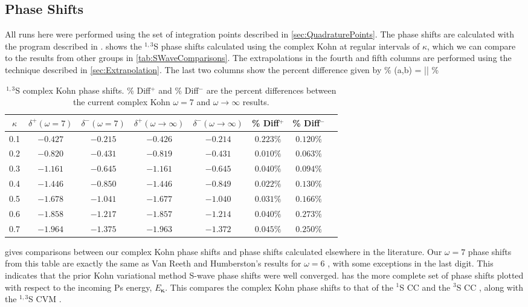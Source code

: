 \documentclass[Dissertation.tex]{subfiles}
\begin{document}
\subsection{Phase Shifts}
All runs here were performed using the set of integration points described in \cref{sec:QuadraturePoints}. The phase shifts are calculated with the program described in \cite{}.  shows the $^{1,3}$S phase shifts calculated using the complex Kohn at regular intervals of $\kappa$, which we can compare to the results from other groups in \cref{tab:SWaveComparisons}. The extrapolations in the fourth and fifth columns are performed using the technique described in \cref{sec:Extrapolation}. The last two columns show the percent difference given by
\beq
\% (a,b) = \left|\right| \%
\eeq

\begin{table}[H]
\centering
\begin{tabular}{c c c c c c c c}
\toprule
$\kappa$ & $\delta^+ (\omega = 7)$ & $\delta^- (\omega = 7)$ & $\delta^+ (\omega \rightarrow \infty)$ & $\delta^- (\omega \rightarrow \infty)$ & \% Diff$^+$ & \% Diff$^-$ \\
\midrule
0.1 & $-0.427$ & $-0.215$ & $-0.426$ & $-0.214$ & $0.223\%$ & $0.120\%$ \\
0.2 & $-0.820$ & $-0.431$ & $-0.819$ & $-0.431$ & $0.010\%$ & $0.063\%$ \\
0.3 & $-1.161$ & $-0.645$ & $-1.161$ & $-0.645$ & $0.040\%$ & $0.094\%$ \\
0.4 & $-1.446$ & $-0.850$ & $-1.446$ & $-0.849$ & $0.022\%$ & $0.130\%$ \\
0.5 & $-1.678$ & $-1.041$ & $-1.677$ & $-1.040$ & $0.031\%$ & $0.166\%$ \\
0.6 & $-1.858$ & $-1.217$ & $-1.857$ & $-1.214$ & $0.040\%$ & $0.273\%$ \\
0.7 & $-1.964$ & $-1.375$ & $-1.963$ & $-1.372$ & $0.045\%$ & $0.250\%$ \\
\bottomrule
\end{tabular}
\caption{$^{1,3}$S complex Kohn phase shifts. \% Diff$^+$ and \% Diff$^-$ are the percent differences between the
 current complex Kohn $\omega = 7$ and $\omega \rightarrow \infty$ results.}
\label{tab:SWavePhase}
\end{table}

 gives comparisons between our complex Kohn phase shifts and phase shifts calculated elsewhere in the literature. Our $\omega = 7$ phase shifts from this table are exactly the same as Van Reeth and Humberston's results for $\omega = 6$ \cite{VanReeth2003}, with some exceptions in the last digit. This indicates that the prior Kohn variational method S-wave phase shifts were well converged. 
 has the more complete set of phase shifts plotted with respect to the incoming Ps energy, $E_{\bm \kappa}$. This compares the complex Kohn phase shifts to that of the $^1$S CC \cite{Walters2004} and the $^3$S CC \cite{Blackwood2002}, along with the $^{1,3}$S CVM \cite{Zhang2012}. 
\end{document}
